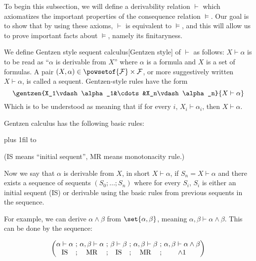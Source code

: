 To begin this subsection, we will define a derivability relation $\vdash$ which axiomatizes the important properties of the consequence relation $\vDash$.
Our goal is to show that by using these axioms, $\vdash$ is equivalent to $\vDash$, and this will allow us to prove important facts about $\vDash$, namely its finitaryness.

\bdefn

    We define {\emphcolor Gentzen style sequent calculus}[Gentzen style] of $\vdash$ as follows: $X\vdash\alpha$ is to be read as ``$\alpha$ is derivable from $X$'' where
    $\alpha$ is a formula and $X$ is a set of formulas.
    A pair $(X,\alpha)\in\powsetof{{\cal F}}\times{\cal F}$, or more suggestively written $X\vdash\alpha$, is called a {\emphcolor sequent}.
    Gentzen-style rules have the form
    $$ \gentzen{X_1\vdash\alpha_1&\cdots&X_n\vdash\alpha_n}{X\vdash\alpha} $$
    Which is to be understood as meaning that if for every $i$, $X_i\vdash\alpha_i$, then $X\vdash\alpha$.

    Gentzen calculus has the following basic rules:

    \tabskip=0pt plus 1fil
    {\jot\halign to}

    (IS means ``initial sequent'', MR means monotonacity rule.)

    Now we say that $\alpha$ is derivable from $X$, in short $X\vdash\alpha$, if $S_n=X\vdash\alpha$ and there exists a sequence of sequents $(S_0;\dots;S_n)$ where for every $S_i$, $S_i$ is either an
    initial sequent (IS) or derivable using the basic rules from previous sequents in the sequence.

\edefn

For example, we can derive $\alpha\land\beta$ from $\set{\alpha,\beta}$, meaning $\alpha,\beta\vdash\alpha\land\beta$.
This can be done by the sequence:

$$
\left(\vcenter{
    \halign{\hfil$#$\hfil&&\ ;\ \hfil$#$\hfil\cr
        \alpha\vdash\alpha & \alpha,\beta\vdash\alpha & \beta\vdash\beta & \alpha,\beta\vdash\beta & \alpha,\beta\vdash\alpha\land\beta\cr
        \hbox{IS} & \hbox{MR} & \hbox{IS} & \hbox{MR} & \land1\cr
    }
}\right)
$$

